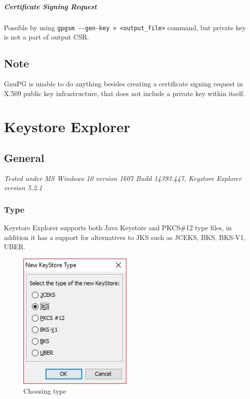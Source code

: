 \documentclass[10pt, a4paper]{report}
\begin{document}
      \paragraph{Certificate Signing Request}
Possible by using \verb+gpgsm --gen-key > <output_file>+ command, but private key is not a part of output CSR.     
\section{Note}
GnuPG is unable to do anything besides creating a certificate signing request in X.509 public key infrastructure, that does not include a private key within itself.

\chapter{Keystore Explorer}

\section{General}

\textit{Tested under MS Windows 10 version 1607 Build 14393.447, Keystore Explorer version 5.2.1}

  \subsection{Type}
Keystore Explorer supports both Java Keystore and PKCS\#12 type files, in addition it has a support for alternatives to JKS such as JCEKS, BKS, BKS-V1, UBER.
\begin{figure}[!htbp]
 \caption{Choosing type}
 \centering
  \includegraphics[width=0.5\textwidth]{../Dependancies/Keystore_Explorer/Type.jpg}
\end{figure}
  
\end{document}
